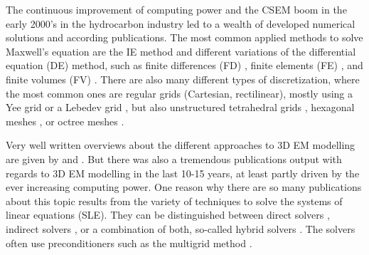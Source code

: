 \documentclass[
    paper,
  ]{geophysics}
\begin{document}
The continuous improvement of computing power and the CSEM boom in the early 2000's in the hydrocarbon industry led to a wealth of developed numerical solutions and according publications. The most common applied methods to solve Maxwell's equation are the IE method \citep{GJI.74.Raiche, RS.02.Hursan, GEO.06.Zhdanov, GP.10.Tehrani, CAG.16.Kruglyakov, MGS.17.Kruglyakov} and different variations of the differential equation (DE) method, such as finite differences (FD) \citep{GEO.93.Wang, RSC.94.Mackie, RS.94.Druskin, GEO.09.Streich, CAG.13.Sommer}, finite elements (FE) \citep{GEO.04.Commer, GJI.11.Schwarzbach,GEO.12.daSilva, GJI.13.Grayver, GJI.13.Puzyrev, SEG.16.Zhang}, and finite volumes (FV) \citep{EM.90.Madsen, SIAM.01.Haber, PIER.01.Clemens, GEO.14.Jahandari}. There are also many different types of discretization, where the most common ones are regular grids (Cartesian, rectilinear), mostly using a Yee grid \citep{IEEE.66.Yee} or a Lebedev grid \citep{CMMP.64.Lebedev}, but also unstructured tetrahedral grids \citep{SEG.16.Zhang, CAG.17.Cai}, hexagonal meshes \citep{CAG.14.Cai}, or octree meshes \citep{ECP.07.Haber}.

Very well written overviews about the different approaches to 3D EM modelling are given by \cite{SG.05.Avdeev} and \cite{SG.10.Borner}. But there was also a tremendous publications output with regards to 3D EM modelling in the last 10-15 years, at least partly driven by the ever increasing computing power. One reason why there are so many publications about this topic results from the variety of techniques to solve the systems of linear equations (SLE). They can be distinguished between direct solvers \citep{GEO.09.Streich, GP.14.Chung, GEO.14.Jaysaval, GEO.15.Grayver, SEG.15.Oh, GJI.18.Wang}, indirect solvers \citep{GJI.15.Jaysaval}, or a combination of both, so-called hybrid solvers \citep{GEO.18.Liu}. The solvers often use preconditioners such as the multigrid method \citep{SIAM.02.Aruliah, GJI.16.Jaysaval}.
\end{document}
